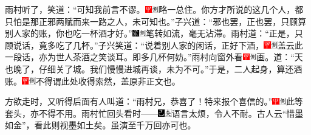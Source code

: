 雨村听了，笑道：``可知我前言不谬。{\includegraphics[width=3mm]{../Images/00002}\includegraphics[width=3mm]{../Images/00011}\footnotesize \kaishu 略一总住。}你方才所说的这几个人，都只怕是那正邪两赋而来一路之人，未可知也。''子兴道：``邪也罢，正也罢，只顾算别人家的账，你也吃一杯酒才好。''{\includegraphics[width=3mm]{../Images/00006}\includegraphics[width=3mm]{../Images/00011}\footnotesize \kaishu 笔转如流，毫无沾滞。}雨村道：``正是，只顾说话，竟多吃了几杯。''子兴笑道：``说着别人家的闲话，正好下酒，{\includegraphics[width=3mm]{../Images/00002}\includegraphics[width=3mm]{../Images/00011}\footnotesize \kaishu 盖云此一段话，亦为世人茶酒之笑谈耳。}即多几杯何妨。''雨村向窗外看{\includegraphics[width=3mm]{../Images/00002}\includegraphics[width=3mm]{../Images/00011}\footnotesize \kaishu 画。}道：``天也晚了，仔细关了城。我们慢慢进城再谈，未为不可。''于是，二人起身，算还酒账。{\includegraphics[width=3mm]{../Images/00002}\includegraphics[width=3mm]{../Images/00011}\footnotesize \kaishu 不得谓此处收得索然，盖原非正文也。}

方欲走时，又听得后面有人叫道：``雨村兄，恭喜了！特来报个喜信的。''{\includegraphics[width=3mm]{../Images/00002}\includegraphics[width=3mm]{../Images/00011}\footnotesize \kaishu 此等套头，亦不得不用。}雨村忙回头看时------{\includegraphics[width=3mm]{../Images/00003}\includegraphics[width=3mm]{../Images/00012}\footnotesize \kaishu 语言太烦，令人不耐。古人云``惜墨如金''，看此则视墨如土矣。虽演至千万回亦可也。}

